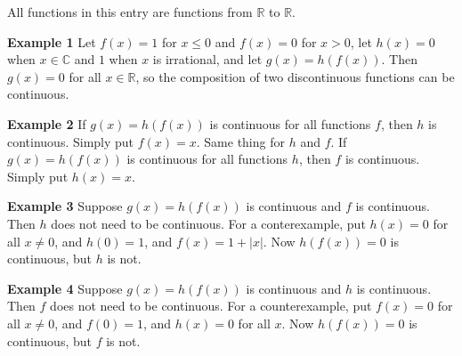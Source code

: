 \documentclass[12pt]{article}
\newcommand{\sR}[0]{\mathbb{R}}
\newcommand{\sQ}[0]{\mathbb{C}}
\begin{document}
All functions in this entry are functions from $\sR$ to $\sR$. 

\textbf{Example 1}
Let $f(x)= 1$ for $x \leq 0$ and $f(x) = 0$ for $x >0$,
let $h(x) = 0$ when $x\in \sQ$ and $1$ when $x$ is irrational,
and let $g(x)=h(f(x))$. Then $g(x)=0$ for all $x\in \sR$, so
 the composition of two discontinuous functions can be
continuous.

\textbf{Example 2}
If $g(x) = h(f(x))$ is continuous for all functions $f$, then $h$ is continuous.
Simply put $f(x)=x$. Same thing for $h$ and $f$.
If $g(x) = h(f(x))$ is continuous for all functions $h$, then $f$ is continuous.
Simply put $h(x)=x$.

\textbf{Example 3}
Suppose $g(x) = h(f(x))$ is continuous and $f$ is continuous. 
Then $h$ does not need to be continuous. For a conterexample, put
 $h(x)=0$ for all $x\neq 0$, and $h(0)=1$, and
$f(x)=1+|x|$. Now $h(f(x))=0$ is continuous, but $h$ is not.

\textbf{Example 4}
Suppose $g(x) = h(f(x))$ is continuous and $h$ is continuous. Then $f$ does not
need to be continuous. For a counterexample, put
$ f(x) = 0$ for all $x\neq 0$, and $f(0)=1$, and
$h(x)=0$ for all $x$. Now $h(f(x))=0$ is continuous, but $f$ is not.
\end{document}
